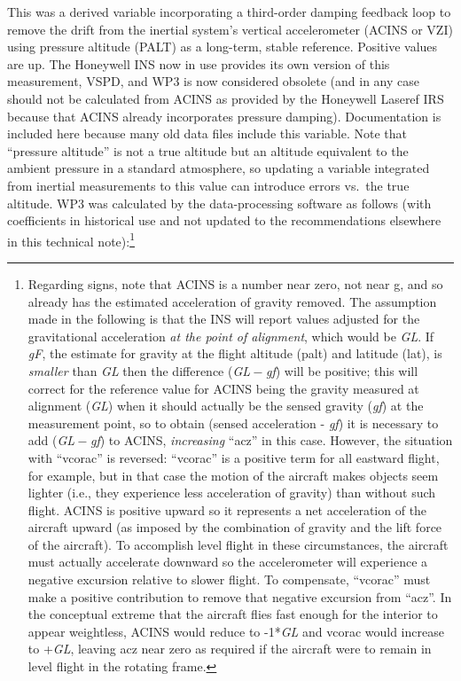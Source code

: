 \documentclass[
  english,
]{book}
\begin{document}
\protect\hypertarget{WP3ux20algorithm}{}{}This was a derived variable
incorporating a third-order damping feedback loop to remove the drift
from the inertial system's vertical accelerometer (ACINS or VZI) using
pressure altitude (PALT) as a long-term, stable reference. Positive
values are up. The Honeywell INS now in use provides its own version of
this measurement, VSPD, and WP3 is now considered obsolete (and in any
case should not be calculated from ACINS as provided by the Honeywell
Laseref IRS because that ACINS already incorporates pressure damping).
Documentation is included here because many old data files include this
variable. Note that ``pressure altitude'' is not a true altitude but an
altitude equivalent to the ambient pressure in a standard atmosphere, so
updating a variable integrated from inertial measurements to this value
can introduce errors vs.~the true altitude. WP3 was calculated by the
data-processing software as follows (with coefficients in historical use
and not updated to the recommendations elsewhere in this technical
note):\footnote{Regarding signs, note that ACINS is a number near zero,
  not near g, and so already has the estimated acceleration of gravity
  removed. The assumption made in the following is that the INS will
  report values adjusted for the gravitational acceleration \emph{at the
  point of alignment}, which would be {\emph{G}\emph{L}}. If
  {\emph{g}\emph{F}}, the estimate for gravity at the flight altitude
  (palt) and latitude (lat), is \emph{smaller} than {\emph{G}\emph{L}}
  then the difference ({\emph{G}\emph{L} − \emph{g}\emph{f}}) will be
  positive; this will correct for the reference value for ACINS being
  the gravity measured at alignment ({\emph{G}\emph{L}}) when it should
  actually be the sensed gravity ({\emph{g}\emph{f}}) at the measurement
  point, so to obtain (sensed acceleration - {\emph{g}\emph{f}}) it is
  necessary to add ({\emph{G}\emph{L} − \emph{g}\emph{f}}) to ACINS,
  \emph{increasing} ``acz'' in this case. However, the situation with
  ``vcorac'' is reversed: ``vcorac'' is a positive term for all eastward
  flight, for example, but in that case the motion of the aircraft makes
  objects seem lighter (i.e., they experience less acceleration of
  gravity) than without such flight. ACINS is positive upward so it
  represents a net acceleration of the aircraft upward (as imposed by
  the combination of gravity and the lift force of the aircraft). To
  accomplish level flight in these circumstances, the aircraft must
  actually accelerate downward so the accelerometer will experience a
  negative excursion relative to slower flight. To compensate,
  ``vcorac'' must make a positive contribution to remove that negative
  excursion from ``acz''. In the conceptual extreme that the aircraft
  flies fast enough for the interior to appear weightless, ACINS would
  reduce to -1*{\emph{G}\emph{L}} and vcorac would increase to
  +{\emph{G}\emph{L}}, leaving acz near zero as required if the aircraft
  were to remain in level flight in the rotating frame.}
\end{document}
